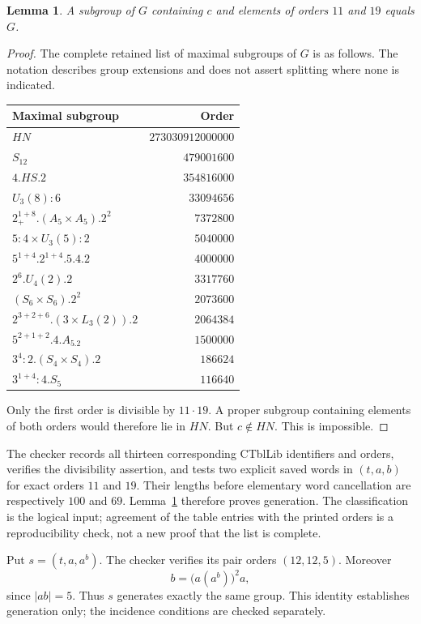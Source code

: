 \documentclass[11pt]{article}
\newtheorem{lemma}{Lemma}
\begin{document}
\begin{lemma}\label{lem:gen}
A subgroup of $G$ containing $c$ and elements of orders $11$ and $19$ equals $G$.
\end{lemma}
\begin{proof}
The complete retained list of maximal subgroups of $G$ is as follows. The notation describes group extensions and does not assert splitting where none is indicated.
\begin{center}\small
\begin{tabular}{lr}\toprule
Maximal subgroup&Order\\\midrule
$HN$&$273030912000000$\\
$S_{12}$&$479001600$\\
$4.HS.2$&$354816000$\\
$U_3(8):6$&$33094656$\\
$2^{1+8}_{+}.(A_5\times A_5).2^2$&$7372800$\\
$5:4\times U_3(5):2$&$5040000$\\
$5^{1+4}.2^{1+4}.5.4.2$&$4000000$\\
$2^6.U_4(2).2$&$3317760$\\
$(S_6\times S_6).2^2$&$2073600$\\
$2^{3+2+6}.(3\times L_3(2)).2$&$2064384$\\
$5^{2+1+2}.4.A_5.2$&$1500000$\\
$3^4:2.(S_4\times S_4).2$&$186624$\\
$3^{1+4}:4.S_5$&$116640$\\\bottomrule
\end{tabular}
\end{center}
Only the first order is divisible by $11\cdot19$. A proper subgroup containing elements of both orders would therefore lie in $HN$. But $c\notin HN$. This is impossible.
\end{proof}
The checker records all thirteen corresponding CTblLib identifiers and orders, verifies the divisibility assertion, and tests two explicit saved words in $(t,a,b)$ for exact orders $11$ and $19$. Their lengths before elementary word cancellation are respectively $100$ and $69$. Lemma~\ref{lem:gen} therefore proves generation. The classification is the logical input; agreement of the table entries with the printed orders is a reproducibility check, not a new proof that the list is complete.

Put $s=(t,a,a^b)$. The checker verifies its pair orders $(12,12,5)$. Moreover
\[
 b=\bigl(a(a^b)\bigr)^2a,
\]
since $|ab|=5$. Thus $s$ generates exactly the same group. This identity establishes generation only; the incidence conditions are checked separately.
\end{document}
